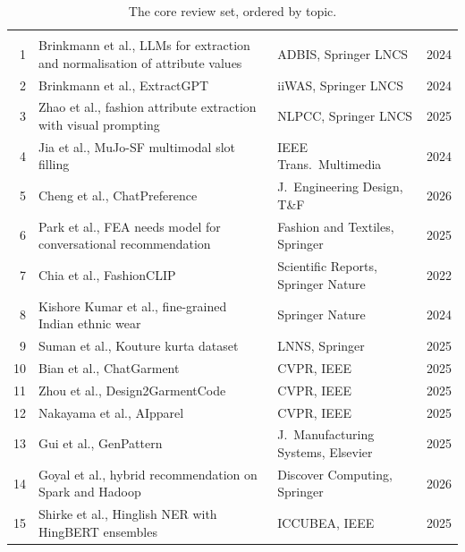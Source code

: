 \begin{table}[t]
\centering\small
\caption{The core review set, ordered by topic.}\label{tab:core}
\begin{tabularx}{\textwidth}{@{}rLP{3.4cm}r@{}}
\thd{} &  &  & \\
1 & Brinkmann et al., LLMs for extraction and normalisation of attribute values \cite{brinkmann2024adbis} & ADBIS, Springer LNCS & 2024\\
2 & Brinkmann et al., ExtractGPT \cite{brinkmann2024extractgpt} & iiWAS, Springer LNCS & 2024\\
3 & Zhao et al., fashion attribute extraction with visual prompting \cite{zhao2025ave} & NLPCC, Springer LNCS & 2025\\
4 & Jia et al., MuJo-SF multimodal slot filling \cite{jia2024mujo} & IEEE Trans.\ Multimedia & 2024\\
5 & Cheng et al., ChatPreference \cite{cheng2026chatpref} & J.\ Engineering Design, T\&F & 2026\\
6 & Park et al., FEA needs model for conversational recommendation \cite{park2025fea} & Fashion and Textiles, Springer & 2025\\
7 & Chia et al., FashionCLIP \cite{chia2022fashionclip} & Scientific Reports, Springer Nature & 2022\\
8 & Kishore Kumar et al., fine-grained Indian ethnic wear \cite{kumar2024ethnic} & Springer Nature & 2024\\
9 & Suman et al., Kouture kurta dataset \cite{suman2025kouture} & LNNS, Springer & 2025\\
10 & Bian et al., ChatGarment \cite{bian2025chatgarment} & CVPR, IEEE & 2025\\
11 & Zhou et al., Design2GarmentCode \cite{zhou2025d2gc} & CVPR, IEEE & 2025\\
12 & Nakayama et al., AIpparel \cite{nakayama2025aipparel} & CVPR, IEEE & 2025\\
13 & Gui et al., GenPattern \cite{gui2025genpattern} & J.\ Manufacturing Systems, Elsevier & 2025\\
14 & Goyal et al., hybrid recommendation on Spark and Hadoop \cite{goyal2026hybrid} & Discover Computing, Springer & 2026\\
15 & Shirke et al., Hinglish NER with HingBERT ensembles \cite{shirke2025hinglish} & ICCUBEA, IEEE & 2025\\
\end{tabularx}
\end{table}


